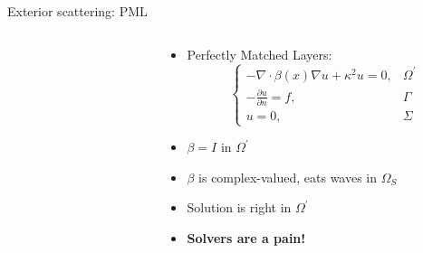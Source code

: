 \documentclass{beamer}
\begin{document}
\begin{frame}{Exterior scattering: PML}
    \begin{columns}
    \begin{column}{0.45\textwidth}
        \begin{figure}[ht]
        \begin{center}
        \end{center}
        \end{figure}
    \end{column}
    \begin{column}{0.55\textwidth}
        \begin{itemize}
            \item Perfectly Matched Layers:
            \[
                \begin{cases}
                    -\nabla \cdot \beta(x) \nabla u + \kappa^2 u = 0,  & \Omega^\prime \\
                    -\frac{\partial u}{\partial n}  =  f, &\Gamma \\
                    u = 0, &\Sigma
                \end{cases}
            \]
              \item<2-> $\beta = I$ in $\Omega^\prime$
              \item<3-> $\beta$ is complex-valued, eats waves in $\Omega_S$
              \item<4-> Solution is right in $\Omega^\prime$
              \item<5-> {\bf Solvers are a pain!}
        \end{itemize}
    \end{column}
    \end{columns}
\end{frame}
\end{document}

